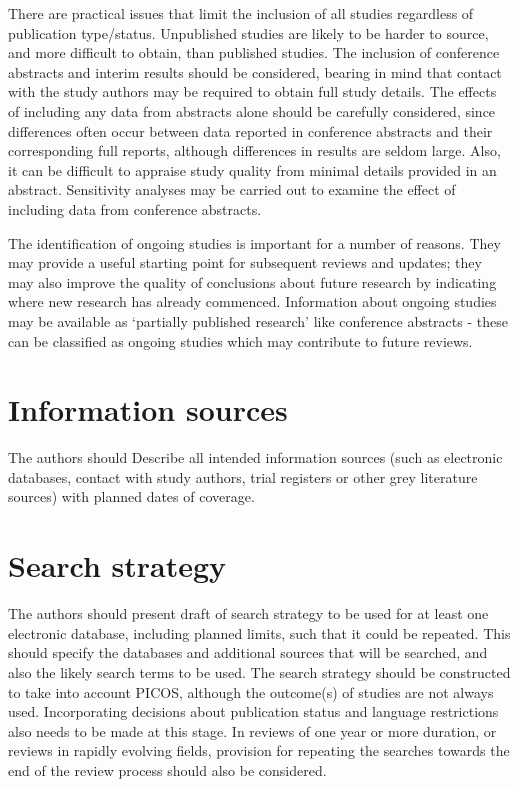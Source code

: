 \documentclass[
  10pt,
  a4paper,
  DIV=11,
  numbers=noendperiod]{scrreprt}
\begin{document}
There are practical issues that limit the inclusion of all studies
regardless of publication type/status. Unpublished studies are likely to
be harder to source, and more difficult to obtain, than published
studies. The inclusion of conference abstracts and interim results
should be considered, bearing in mind that contact with the study
authors may be required to obtain full study details. The effects of
including any data from abstracts alone should be carefully considered,
since differences often occur between data reported in conference
abstracts and their corresponding full reports, although differences in
results are seldom large. Also, it can be difficult to appraise study
quality from minimal details provided in an abstract. Sensitivity
analyses may be carried out to examine the effect of including data from
conference abstracts.

The identification of ongoing studies is important for a number of
reasons. They may provide a useful starting point for subsequent reviews
and updates; they may also improve the quality of conclusions about
future research by indicating where new research has already commenced.
Information about ongoing studies may be available as `partially
published research' like conference abstracts - these can be classified
as ongoing studies which may contribute to future reviews.

\section{Information sources}\label{information-sources}

The authors should Describe all intended information sources (such as
electronic databases, contact with study authors, trial registers or
other grey literature sources) with planned dates of coverage.

\section{Search strategy}\label{search-strategy}

The authors should present draft of search strategy to be used for at
least one electronic database, including planned limits, such that it
could be repeated. This should specify the databases and additional
sources that will be searched, and also the likely search terms to be
used. The search strategy should be constructed to take into account
PICOS, although the outcome(s) of studies are not always used.
Incorporating decisions about publication status and language
restrictions also needs to be made at this stage. In reviews of one year
or more duration, or reviews in rapidly evolving fields, provision for
repeating the searches towards the end of the review process should also
be considered.
\end{document}
